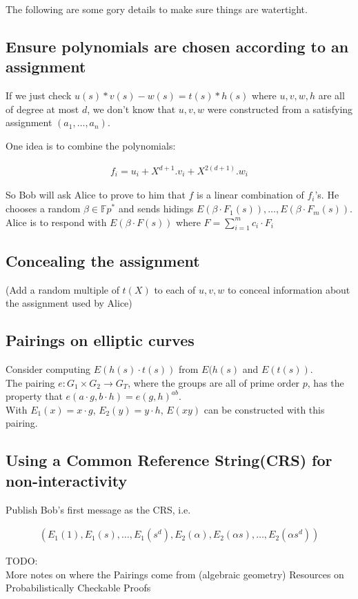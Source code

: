 \documentclass[12pt]{article}
\begin{document}
The following are some gory details to make sure things are watertight.

\subsection*{Ensure polynomials are chosen according to an assignment}

If we just check 
$u(s)*v(s)-w(s) = t(s)*h(s)$
where $u, v, w, h$ are all of degree at most $d$, we 
don't know that $u, v, w$ were constructed from 
a satisfying assignment $(a_1, \dots, a_n)$.

One idea is to combine the polynomials:

\begin{align*}
f_i = u_i + X^{d+1}.v_i + X^{2(d+1)}.w_i
\end{align*}

So Bob will ask Alice to prove to him that $f$ is a linear combination 
of $f_i$'s. He chooses a random $\beta \in \mathbb{F}p^*$ and sends 
hidings $E(\beta\cdot F_1(s)), \dots, E(\beta\cdot F_m(s))$. 
Alice is to respond with $E(\beta\cdot F(s))$ where 
$
F = \sum_{i=1}^m c_i\cdot F_i
$

\subsection*{Concealing the assignment}

(Add a random multiple of $t(X)$ to each of $u, v, w$ to conceal 
information about the assignment used by Alice)


\subsection*{Pairings on elliptic curves}

Consider computing  $E(h(s)\cdot t(s))$ from $E(h(s)$ and $E(t(s))$.\\

The pairing $e: G_1 \times G_2 \rightarrow G_T$, where
the groups are all of prime order $p$, has the property that
$e(a\cdot g, b\cdot h) = e(g, h)^{ab}$.\\

With $E_1(x) = x\cdot g$,
$E_2(y) = y\cdot h$, $E(xy)$ can be constructed with this pairing.

\subsection*{Using a Common Reference String(CRS) for non-interactivity}

Publish Bob's first message as the CRS, i.e.

\begin{align*}
  (E_1(1), E_1(s), \dots, E_1(s^d), E_2(\alpha), E_2(\alpha s), \dots,
  E_2(\alpha s^d))
\end{align*}


TODO: \\
More notes on where the Pairings come from (algebraic geometry)
Resources on Probabilistically Checkable Proofs
\end{document}
